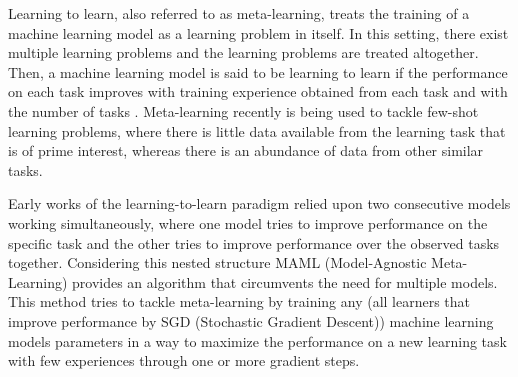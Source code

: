 

Learning to learn, also referred to as meta-learning, treats the training of a machine learning model as a learning problem in itself. In this setting, there exist multiple learning problems and the learning problems are treated altogether. Then, a machine learning model is said to be learning to learn if the performance on each task improves with training experience obtained from each task and with the number of tasks \cite{thrun1998}. Meta-learning recently is being used to tackle few-shot learning problems, where there is little data available from the learning task that is of prime interest, whereas there is an abundance of data from other similar tasks. 


Early works of the learning-to-learn paradigm relied upon two consecutive models working simultaneously, where one model tries to improve performance on the specific task and the other tries to improve performance over the observed tasks together. Considering this nested structure  MAML (Model-Agnostic Meta-Learning) \cite{finn2017} provides an algorithm that circumvents the need for multiple models. This method tries to tackle meta-learning by training any (all learners that improve performance by SGD (Stochastic Gradient Descent)) machine learning models parameters in a way to maximize the performance on a new learning task with few experiences through one or more gradient steps. 

